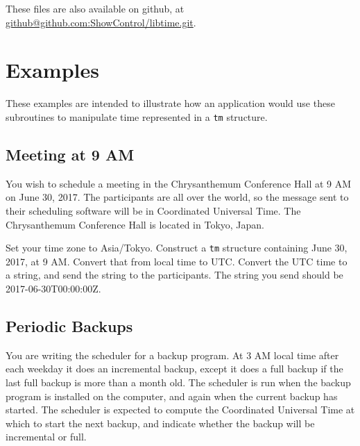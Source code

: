 \documentclass[letterpaper,twoside]{article}
\begin{document}

These files are also available on github, at
\url{github@github.com:ShowControl/libtime.git}.

\section{Examples}
These examples are intended to illustrate how an application would
use these subroutines to manipulate time represented in a \verb|tm| structure.

\subsection{Meeting at 9 AM}
You wish to schedule a meeting in the Chrysanthemum Conference Hall
at 9 AM on June 30, 2017.  The participants are all over the world,
so the message sent to their scheduling software will be in
Coordinated Universal Time.  The Chrysanthemum Conference Hall
is located in Tokyo, Japan.

Set your time zone to Asia/Tokyo.  Construct a \verb|tm| structure
containing June 30, 2017, at 9 AM.  Convert that from local time to UTC.
Convert the UTC time to a string, and send the string to
the participants.  The string you send should be 2017-06-30T00:00:00Z.

\subsection{Periodic Backups}
You are writing the scheduler for a backup program.  At 3 AM
local time
after each weekday it does an incremental backup,
except it does a full backup if the last full backup is more
than a month old.  The scheduler is run when the backup program
is installed on the computer, and again when
the current backup has started.  The scheduler is expected
to compute the Coordinated Universal Time at which to start
the next backup, and indicate whether the backup will be
incremental or full.
\end{document}
